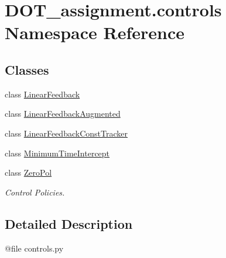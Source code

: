 \hypertarget{namespace_d_o_t__assignment_1_1controls}{}\section{D\+O\+T\+\_\+assignment.\+controls Namespace Reference}
\label{namespace_d_o_t__assignment_1_1controls}
\subsection*{Classes}
\begin{DoxyCompactItemize}
\item 
class \mbox{\hyperlink{class_d_o_t__assignment_1_1controls_1_1_linear_feedback}{Linear\+Feedback}}
\item 
class \mbox{\hyperlink{class_d_o_t__assignment_1_1controls_1_1_linear_feedback_augmented}{Linear\+Feedback\+Augmented}}
\item 
class \mbox{\hyperlink{class_d_o_t__assignment_1_1controls_1_1_linear_feedback_const_tracker}{Linear\+Feedback\+Const\+Tracker}}
\item 
class \mbox{\hyperlink{class_d_o_t__assignment_1_1controls_1_1_minimum_time_intercept}{Minimum\+Time\+Intercept}}
\item 
class \mbox{\hyperlink{class_d_o_t__assignment_1_1controls_1_1_zero_pol}{Zero\+Pol}}
\begin{DoxyCompactList}\small\item\em Control Policies. \end{DoxyCompactList}\end{DoxyCompactItemize}


\subsection{Detailed Description}
\begin{DoxyVerb}@file controls.py
\end{DoxyVerb}
 